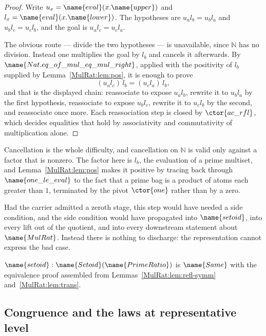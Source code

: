 \begin{proof}
Write $u_x = \name{eval}(x.\name{upper})$ and
$l_x = \name{eval}(x.\name{lower})$.  The hypotheses are
$u_a l_b = u_b l_a$ and $u_b l_c = u_c l_b$, and the goal is
$u_a l_c = u_c l_a$.

The obvious route --- divide the two hypotheses --- is unavailable, since
$\mathbb{N}$ has no division.  Instead one multiplies the goal by $l_b$ and
cancels it afterwards.  By $\name{Nat.eq\_of\_mul\_eq\_mul\_right}$, applied
with the positivity of $l_b$ supplied by Lemma~\ref{MulRat:lem:pos}, it is
enough to prove
\[
  (u_a l_c) \, l_b = (u_c l_a) \, l_b,
\]
and that is the displayed chain: reassociate to expose $u_a l_b$, rewrite it
to $u_b l_a$ by the first hypothesis, reassociate to expose $u_b l_c$, rewrite
it to $u_c l_b$ by the second, and reassociate once more.  Each reassociation
step is closed by $\ctor{ac\_rfl}$, which decides equalities that hold by
associativity and commutativity of multiplication alone.
\end{proof}

\begin{designnote}\label{MulRat:note:cancel}
Cancellation is the whole difficulty, and cancellation on $\mathbb{N}$ is
valid only against a factor that is nonzero.  The factor here is $l_b$, the
evaluation of a prime multiset, and Lemma~\ref{MulRat:lem:pos} makes it
positive by tracing back through $\name{one\_le\_eval}$ to the fact that a
prime bag is a product of atoms each greater than $1$, terminated by the
pivot $\ctor{one}$ rather than by a zero.

Had the carrier admitted a zeroth stage, this step would have needed a side
condition, and the side condition would have propagated into $\name{setoid}$,
into every lift out of the quotient, and into every downstream statement about
$\name{MulRat}$.  Instead there is nothing to discharge: the representation
cannot express the bad case.
\end{designnote}

\begin{definition}
\label{MulRat:def:setoid}
$\name{setoid} : \name{Setoid}(\name{PrimeRatio})$ is $\name{Same}$ with the
equivalence proof assembled from Lemmas~\ref{MulRat:lem:refl-symm}
and~\ref{MulRat:lem:trans}.
\end{definition}

\subsection{Congruence and the laws at representative level}

